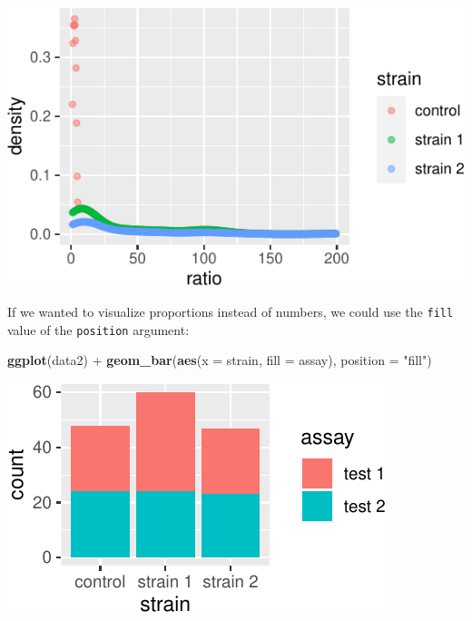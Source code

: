 \documentclass[]{book}
\newenvironment{Shaded}{}{}
\newcommand{\DataTypeTok}[1]{\textcolor[rgb]{0.56,0.13,0.00}{#1}}
\newcommand{\KeywordTok}[1]{\textcolor[rgb]{0.00,0.44,0.13}{\textbf{#1}}}
\newcommand{\NormalTok}[1]{#1}
\newcommand{\OperatorTok}[1]{\textcolor[rgb]{0.40,0.40,0.40}{#1}}
\newcommand{\StringTok}[1]{\textcolor[rgb]{0.25,0.44,0.63}{#1}}
\begin{document}
\begin{center}\includegraphics[width=\textwidth]{TRES-Tidy-Tutorial_files/figure-latex/unnamed-chunk-115-1} \end{center}

If we wanted to visualize proportions instead of numbers, we could use the \texttt{fill} value of the \texttt{position} argument:

\begin{Shaded}
\begin{Highlighting}[]
\KeywordTok{ggplot}\NormalTok{(data2) }\OperatorTok{+}
\StringTok{  }\KeywordTok{geom_bar}\NormalTok{(}\KeywordTok{aes}\NormalTok{(}\DataTypeTok{x =}\NormalTok{ strain, }\DataTypeTok{fill =}\NormalTok{ assay), }\DataTypeTok{position =} \StringTok{"fill"}\NormalTok{)}
\end{Highlighting}
\end{Shaded}

\begin{center}\includegraphics[width=\textwidth]{TRES-Tidy-Tutorial_files/figure-latex/unnamed-chunk-116-1} \end{center}
\end{document}
